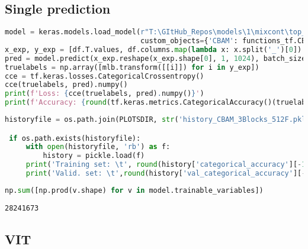 \hypertarget{single-prediction}{%
\subsection{Single prediction}\label{single-prediction}}

\begin{lstlisting}[language=Python]
model = keras.models.load_model(r"T:\GItHub_Repos\models\1\mixcont\top_layer\models\CBAM\CBAM_3Blocks_512F.h5",
                                custom_objects={'CBAM': functions_tf.CBAM})
x_exp, y_exp = [df.T.values, df.columns.map(lambda x: x.split('_')[0]).values] # top layer
pred = model.predict(x_exp.reshape(x_exp.shape[0], 1, 1024), batch_size=213)
truelabels = np.array([mlb.transform([[i]]) for i in y_exp])
cce = tf.keras.losses.CategoricalCrossentropy()
cce(truelabels, pred).numpy()
print(f'Loss: {cce(truelabels, pred).numpy()}')
print(f'Accuracy: {round(tf.keras.metrics.CategoricalAccuracy()(truelabels, pred).numpy()*100, 2)}')
\end{lstlisting}

\begin{lstlisting}[language=Python]
 historyfile = os.path.join(PLOTSDIR, str('history_CBAM_3Blocks_512F.pkl'))

 if os.path.exists(historyfile):
     with open(historyfile, 'rb') as f:
         history = pickle.load(f)
     print('Training set: \t', round(history['categorical_accuracy'][-1]*100, 2), '%')
     print('Valid. set: \t',round(history['val_categorical_accuracy'][-1]*100, 2), '%')
\end{lstlisting}

\begin{lstlisting}[language=Python]
np.sum([np.prod(v.shape) for v in model.trainable_variables])
\end{lstlisting}

\begin{lstlisting}
28241673
\end{lstlisting}

\hypertarget{vit}{%
\subsection{VIT}\label{vit}}

